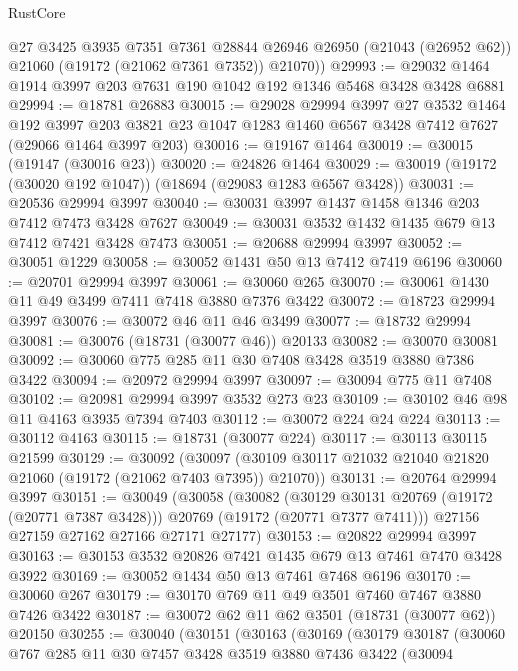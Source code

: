 \begin{lexlean}{RustCore}
\begin{coremodule}
        @27
        @3425
        @3935
        @7351
        @7361
        @28844
        @26946
        @26950
        (@21043 (@26952 @62))
        @21060
        (@19172 (@21062 @7361 @7352))
        @21070))
@29993 := @29032 @1464 @1914 @3997 @203 @7631 @190 @1042 @192 @1346 @5468 @3428 @3428 @6881
@29994 := @18781 @26883
@30015 := @29028
    @29994
    @3997
    @27
    @3532
    @1464
    @192
    @3997
    @203
    @3821
    @23
    @1047
    @1283
    @1460
    @6567
    @3428
    @7412
    @7627
    (@29066 @1464 @3997 @203)
@30016 := @19167 @1464
@30019 := @30015 (@19147 (@30016 @23))
@30020 := @24826 @1464
@30029 := @30019 (@19172 (@30020 @192 @1047)) (@18694 (@29083 @1283 @6567 @3428))
@30031 := @20536 @29994 @3997
@30040 := @30031 @3997 @1437 @1458 @1346 @203 @7412 @7473 @3428 @7627
@30049 := @30031 @3532 @1432 @1435 @679 @13 @7412 @7421 @3428 @7473
@30051 := @20688 @29994 @3997
@30052 := @30051 @1229
@30058 := @30052 @1431 @50 @13 @7412 @7419 @6196
@30060 := @20701 @29994 @3997
@30061 := @30060 @265
@30070 := @30061 @1430 @11 @49 @3499 @7411 @7418 @3880 @7376 @3422
@30072 := @18723 @29994 @3997
@30076 := @30072 @46 @11 @46 @3499
@30077 := @18732 @29994
@30081 := @30076 (@18731 (@30077 @46)) @20133
@30082 := @30070 @30081
@30092 := @30060 @775 @285 @11 @30 @7408 @3428 @3519 @3880 @7386 @3422
@30094 := @20972 @29994 @3997
@30097 := @30094 @775 @11 @7408
@30102 := @20981 @29994 @3997 @3532 @273 @23
@30109 := @30102 @46 @98 @11 @4163 @3935 @7394 @7403
@30112 := @30072 @224 @24 @224
@30113 := @30112 @4163
@30115 := @18731 (@30077 @224)
@30117 := @30113 @30115 @21599
@30129 := @30092
    (@30097 (@30109 @30117 @21032 @21040 @21820 @21060 (@19172 (@21062 @7403 @7395)) @21070))
@30131 := @20764 @29994 @3997
@30151 := @30049
    (@30058
      (@30082
        (@30129 @30131 @20769 (@19172 (@20771 @7387 @3428)))
        @20769
        (@19172 (@20771 @7377 @7411)))
      @27156
      @27159
      @27162
      @27166
      @27171
      @27177)
@30153 := @20822 @29994 @3997
@30163 := @30153 @3532 @20826 @7421 @1435 @679 @13 @7461 @7470 @3428 @3922
@30169 := @30052 @1434 @50 @13 @7461 @7468 @6196
@30170 := @30060 @267
@30179 := @30170 @769 @11 @49 @3501 @7460 @7467 @3880 @7426 @3422
@30187 := @30072 @62 @11 @62 @3501 (@18731 (@30077 @62)) @20150
@30255 := @30040
    (@30151
      (@30163
        (@30169
          (@30179
            @30187
            (@30060
              @767
              @285
              @11
              @30
              @7457
              @3428
              @3519
              @3880
              @7436
              @3422
              (@30094

\end{coremodule}
\end{lexlean}
